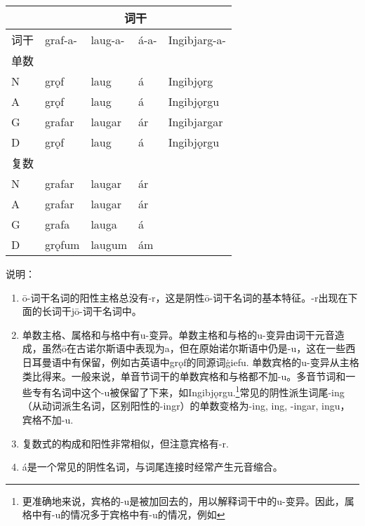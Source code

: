 \begin{longtable}{lllll}
    \toprule
         & \multicolumn{4}{c}{\textbf{词干}}                                 \\
    \midrule
    \endhead
    \bottomrule
    \endfoot
    词干 & graf-a-                  & laug-a- & á-a- & Ingibjarg-a- \\
    单数 &                          &         &      &              \\
    N    & grǫf                     & laug    & á    & Ingibjǫrg    \\
    A    & grǫf                     & laug    & á    & Ingibjǫrgu   \\
    G    & grafar                   & laugar  & ár   & Ingibjargar  \\
    D    & grǫf                     & laug    & á    & Ingibjǫrgu   \\
    复数 &                          &         &      &              \\
    N    & grafar                   & laugar  & ár   &              \\
    A    & grafar                   & laugar  & ár   &              \\
    G    & grafa                    & lauga   & á    &              \\
    D    & grǫfum                   & laugum  & ám   &              \\
  \end{longtable}

说明：

\begin{enumerate}[1)]

  \item
        ō-词干名词的阳性主格总没有-r，这是阴性ō-词干名词的基本特征。-r出现在下面的长词干jō-词干名词中。
  \item
        单数主格、属格和与格中有u-变异。单数主格和与格的u-变异由词干元音造成，虽然ō在古诺尔斯语中表现为a，但在原始诺尔斯语中仍是-u，这在一些西日耳曼语中有保留，例如古英语中grǫf的同源词ġiefu.
        单数宾格的u-变异从主格类比得来。一般来说，单音节词干的单数宾格和与格都不加-u。多音节词和一些专有名词中这个-u被保留了下来，如Ingibjǫrgu.\footnote{更准确地来说，宾格的-u是被加回去的，用以解释词干中的u-变异。因此，属格中有-u的情况多于宾格中有-u的情况，例如}常见的阴性派生词尾-ing（从动词派生名词，区别阳性的-ingr）的单数变格为-ing,
        ing, -ingar, ingu，宾格不加-u.
  \item
        复数式的构成和阳性非常相似，但注意宾格有-r.
  \item
        á是一个常见的阴性名词，与词尾连接时经常产生元音缩合。
\end{enumerate}

